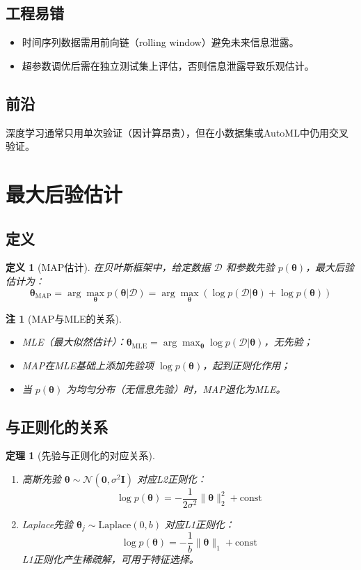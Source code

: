 \documentclass[UTF8, 10pt]{ctexart}
\newtheorem{theorem}{定理}[section]
\newtheorem{definition}{定义}[section]
\newtheorem{remark}{注}[section]
\begin{document}
\subsection{工程易错}
\begin{itemize}
    \item 时间序列数据需用前向链（rolling window）避免未来信息泄露。
    \item 超参数调优后需在独立测试集上评估，否则信息泄露导致乐观估计。
\end{itemize}

\subsection{前沿}
深度学习通常只用单次验证（因计算昂贵），但在小数据集或AutoML中仍用交叉验证。

\section{最大后验估计}
\subsection{定义}
\begin{definition}[MAP估计]
在贝叶斯框架中，给定数据 $\mathcal{D}$ 和参数先验 $p(\bm{\theta})$，最大后验估计为：
\[
\bm{\theta}_{\text{MAP}} = \arg\max_{\bm{\theta}} p(\bm{\theta}|\mathcal{D}) = \arg\max_{\bm{\theta}} \left( \log p(\mathcal{D}|\bm{\theta}) + \log p(\bm{\theta}) \right)
\]
\end{definition}

\begin{remark}[MAP与MLE的关系]
\begin{itemize}
    \item MLE（最大似然估计）：$\bm{\theta}_{\text{MLE}} = \arg\max_{\bm{\theta}} \log p(\mathcal{D}|\bm{\theta})$，无先验；
    \item MAP在MLE基础上添加先验项 $\log p(\bm{\theta})$，起到正则化作用；
    \item 当 $p(\bm{\theta})$ 为均匀分布（无信息先验）时，MAP退化为MLE。
\end{itemize}
\end{remark}

\subsection{与正则化的关系}
\begin{theorem}[先验与正则化的对应关系]
\begin{enumerate}
    \item 高斯先验 $\bm{\theta} \sim \mathcal{N}(\bm{0}, \sigma^2\bm{I})$ 对应L2正则化：
    \[
    \log p(\bm{\theta}) = -\frac{1}{2\sigma^2}\|\bm{\theta}\|_2^2 + \text{const}
    \]
    \item Laplace先验 $\bm{\theta}_j \sim \text{Laplace}(0, b)$ 对应L1正则化：
    \[
    \log p(\bm{\theta}) = -\frac{1}{b}\|\bm{\theta}\|_1 + \text{const}
    \]
    L1正则化产生稀疏解，可用于特征选择。
\end{enumerate}
\end{theorem}
\end{document}
